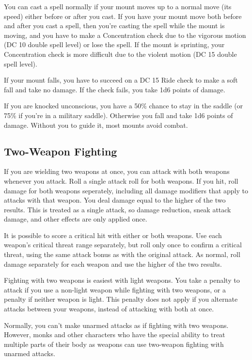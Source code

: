  You can cast a spell normally if your mount moves up to a normal move (its speed) either before or after you cast. If you have your mount move both before and after you cast a spell, then you're casting the spell while the mount is moving, and you have to make a Concentration check due to the vigorous motion (DC 10 \add double spell level) or lose the spell. If the mount is sprinting, your Concentration check is more difficult due to the violent motion (DC 15 \add double spell level).

 If your mount falls, you have to succeed on a DC 15 Ride check to make a soft fall and take no damage. If the check fails, you take 1d6 points of damage.

 If you are knocked unconscious, you have a 50\% chance to stay in the saddle (or 75\% if you're in a military saddle). Otherwise you fall and take 1d6 points of damage. Without you to guide it, most mounts avoid combat.

\subsection{Two-Weapon Fighting}\label{Two-Weapon Fighting}
If you are wielding two weapons at once, you can attack with both weapons whenever you attack. Roll a single attack roll for both weapons. If you hit, roll damage for both weapons seperately, including all damage modifiers that apply to attacks with that weapon. You deal damage equal to the higher of the two results. This is treated as a single attack, so damage reduction, sneak attack damage, and other effects are only applied once.

 It is possible to score a critical hit with either or both weapons. Use each weapon's critical threat range separately, but roll only once to confirm a critical threat, using the same attack bonus as with the original attack. As normal, roll damage separately for each weapon and use the higher of the two results.

 Fighting with two weapons is easiest with light weapons. You take a  penalty to attack if you use a non-light weapon while fighting with two weapons, or a  penalty if neither weapon is light. This penalty does not apply if you alternate attacks between your weapons, instead of attacking with both at once.

 Normally, you can't make unarmed attacks as if fighting with two weapons. However, monks and other characters who have the special ability to treat multiple parts of their body as weapons can use two-weapon fighting with unarmed attacks.

